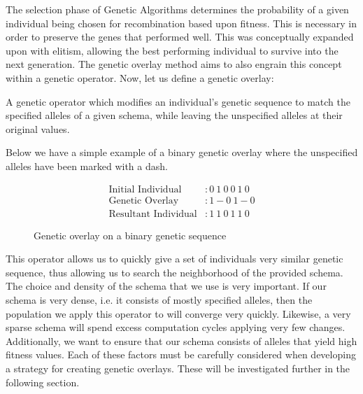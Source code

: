 The selection phase of Genetic Algorithms determines the probability of a given individual being chosen for recombination based upon fitness. This is necessary in order to preserve the genes that performed well. This was conceptually expanded upon with elitism, allowing the best performing individual to survive into the next generation. The genetic overlay method aims to also engrain this concept within a genetic operator. Now, let us define a genetic overlay:

\begin{overlay}
A genetic operator which modifies an individual's genetic sequence to match the specified alleles of a given schema, while leaving the unspecified alleles at their original values. 
\end{overlay}

Below we have a simple example of a binary genetic overlay where the unspecified alleles have been marked with a dash. 

\begin{figure}[h!]
\centering 
\begin{align*}
\text{Initial Individual} &: 0~1~0~0~1~0 		\\
\text{Genetic Overlay} &: 1-0~1-0		\\
\text{Resultant Individual} &: 1~1~0~1~1~0			
\end{align*}

\caption{Genetic overlay on a binary genetic sequence}

\end{figure}

This operator allows us to quickly give a set of individuals very similar genetic sequence, thus allowing us to search the neighborhood of the provided schema. The choice and density of the schema that we use is very important. If our schema is very dense, i.e. it consists of mostly specified alleles, then the population we apply this operator to will converge very quickly. Likewise, a very sparse schema will spend excess computation cycles applying very few changes. Additionally, we want to ensure that our schema consists of alleles that yield high fitness values. Each of these factors must be carefully considered when developing a strategy for creating genetic overlays. These will be investigated further in the following section.